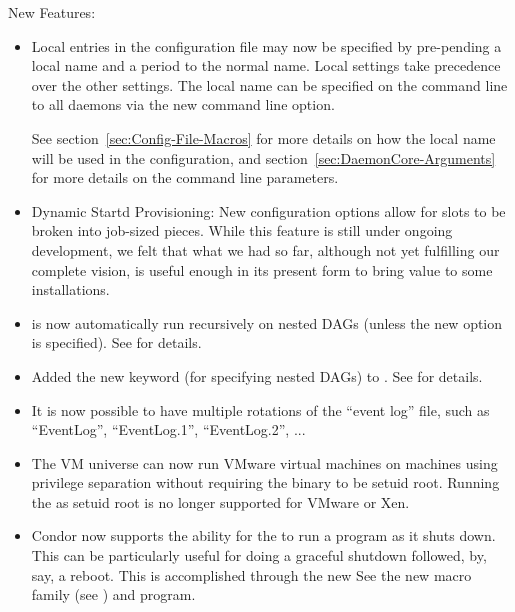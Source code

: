 \noindent New Features:

\begin{itemize}

\item Local entries in the configuration file may now be specified
by pre-pending a local name and a period to the normal name.
Local settings take precedence over the other settings.
The local name can be specified on the command line to all daemons via
the new  command line option. 

See section~\ref{sec:Config-File-Macros} 
for more details on how the local name will be used in the configuration,
and section~\ref{sec:DaemonCore-Arguments} 
for more details on the command line parameters.

\item Dynamic Startd Provisioning: New configuration options allow for slots
	to be broken into job-sized pieces. While this feature is still under
	ongoing development, we felt that what we had so far, although not yet
	fulfilling our complete vision, is useful enough in its present form to
	bring value to some installations.

\item {} is now automatically run recursively on
nested DAGs (unless the new  option is specified).
See \pageref{dagman:NestedRecursion} for details.

\item Added the new  keyword (for specifying nested
DAGs) to .  See \pageref{dagman:SUBDAG} for details.

\item It is now possible to have multiple rotations of the ``event
  log'' file, such as ``EventLog'', ``EventLog.1'', ``EventLog.2'', ...

\item The VM universe can now run VMware virtual machines on machines using
privilege separation without requiring the  binary to be
setuid root. Running the  as setuid root is no longer
supported for VMware or Xen.

\item Condor now supports the ability for the  to run a
  program as it shuts down.  This can be particularly useful for doing
  a graceful shutdown followed, by, say, a reboot.  This is
  accomplished through the new See the new
   macro family (see
  \pageref{param:MasterShutdownProgram}) and 
  program.


\end{itemize}
